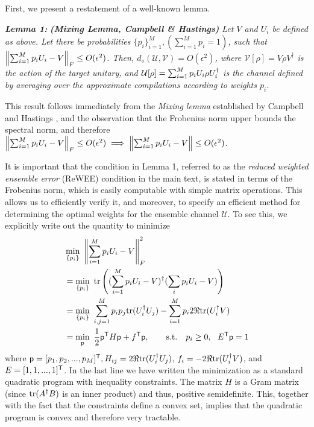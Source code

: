 First, we present a restatement of a well-known lemma.

\noindent \emph{\bf Lemma 1:} \textit{\textbf{(Mixing Lemma, Campbell \& Hastings)}} \emph{Let $V$ and $U_i$ be defined as above. Let there be probabilities $\{p_i\}_{i=1}^M, (\sum_{i=1}^M p_i=1)$, such that $\left\lVert \sum_{i=1}^M p_i U_i - V \right\rVert_F \leq O(\epsilon^2)$. Then, $d_{\diamond}(\mathcal{U}, \mathcal{V}) = O(\epsilon^2)$, where $\mathcal{V}[\rho] = V \rho V^{\dagger}$ is the action of the target unitary, and $\mathcal{U}[\rho] = \sum_{i=1}^M p_i U_i \rho U_i^\dagger$ is the channel defined by averaging over the approximate compilations according to weights $p_i$.}

This result follows immediately from the \emph{Mixing lemma} established by Campbell \cite{PhysRevA.95.042306} and Hastings \cite{hastings2016turning}, and the observation that the Frobenius norm upper bounds the spectral norm, and therefore $\left\lVert \sum_{i=1}^M p_i U_i - V \right\rVert_F \leq O(\epsilon^2) \implies \left\lVert \sum_{i=1}^M p_i U_i - V \right\rVert \leq O(\epsilon^2)$.

It is important that the condition in Lemma 1, referred to as the \emph{reduced weighted ensemble error} (ReWEE) condition in the main text, is stated in terms of the Frobenius norm, which is easily computable with simple matrix operations. This allows us to efficiently verify it, and moreover, to specify an efficient method for determining the optimal weights for the ensemble channel $\mathcal{U}$. To see this, we explicitly write out the quantity to minimize
\begin{align}
    & \min_{\{p_i\}}~ \left\lVert \sum_{i=1}^{M} p_i U_i - V \right\rVert_F^2 \nonumber \\
    &= \min_{\{p_i\}}~ {\rm tr}\left((\sum_{i=1}^{M} p_i U_i - V)^\dagger (\sum_i p_i U_i - V)\right) \nonumber \\
    &= \min_{\{p_i\}}~ \sum_{i,j=1}^{M} p_i p_j {\rm tr}(U_i^\dagger U_j) - \sum_{i=1}^{M} p_i 2\Re{\rm tr}(U_i^\dagger V) \nonumber \\
    &= \min_{{\bf\sf p}}~ \frac{1}{2} {\bf\sf p}^{\sf T} H {\bf\sf p} + f^{\sf T} {\bf\sf p}, \qquad \text{s.t.}\quad  p_i\geq 0, ~~ E^{\sf T} {\bf\sf p} = 1 \label{eq:quadprog}
\end{align}
where ${\bf\sf p} = [p_1, p_2, ..., p_{M}]^{\sf T}, H_{ij} = 2\Re {\rm tr}(U_i^\dagger U_j)$, $f_i = -2\Re{\rm tr}(U_i^\dagger V)$, and $E = [1, 1, ..., 1]^{\sf T}$. In the last line we have written the minimization as a standard quadratic program with inequality constraints. The matrix $H$ is a Gram matrix (since ${\rm tr}(A^\dagger B)$ is an inner product) and thus, positive semidefinite. This, together with the fact that the constraints define a convex set, implies that the quadratic program is convex and therefore very tractable. 

